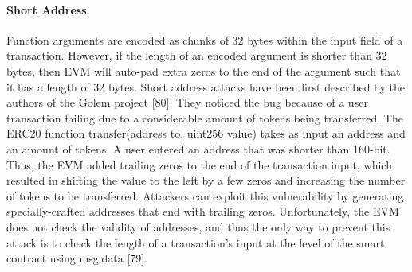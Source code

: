         \paragraph{Short Address}
            Function arguments are encoded as chunks of 32 bytes within the input field of a transaction.
            However, if the length of an encoded argument is shorter than 32 bytes, then EVM will auto-pad extra zeros to the end of the argument such that it has a length of 32 bytes.
            Short address attacks have been first described by the authors of the Golem project [80].
            They noticed the bug because of a user transaction failing due to a considerable amount of tokens being transferred. The ERC20 function transfer(address to, uint256 value) takes as input an address and an amount of tokens.
            A user entered an address that was shorter than 160-bit.
            Thus, the EVM added trailing zeros to the end of the transaction input, which resulted in shifting the value to the left by a few zeros and increasing the number of tokens to be transferred.
            Attackers can exploit this vulnerability by generating specially-crafted addresses that end with trailing zeros.
            Unfortunately, the EVM does not check the validity of addresses, and thus the only way to prevent this attack is to check the length of a transaction’s input at the level of the smart contract using msg.data [79].